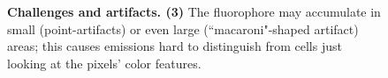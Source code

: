 \begin{landscape}
\begin{figure}[ht]\ContinuedFloat
    \centering
    \caption{\textbf{Challenges and artifacts. (3)}
    The fluorophore may accumulate in small (point-artifacts) or even large (``macaroni"-shaped artifact) areas; this causes emissions hard to distinguish from cells just looking at the pixels' color features.
    }
\end{figure}
\end{landscape}
\clearpage
\restoregeometry